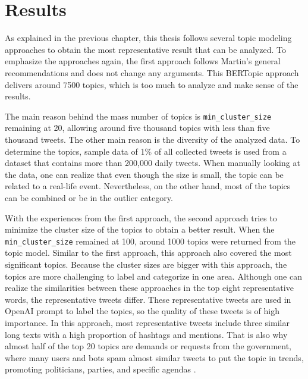 
\chapter{Results}\label{chapter:results}

As explained in the previous chapter, this thesis follows several topic modeling approaches to 
obtain the most representative result that can be analyzed. To emphasize the approaches again, 
the first approach follows Martin's general recommendations and does not change any arguments. 
This BERTopic approach delivers around 7500 topics, which is too much to analyze and make sense 
of the results. 

The main reason behind the mass number of topics is \texttt{min\_cluster\_size} remaining at 20, 
allowing around five thousand topics with less than five thousand tweets. The other main reason 
is the diversity of the analyzed data. To determine the topics, sample data of 1\% of all collected 
tweets is used from a dataset that contains more than 200,000 daily tweets. 
When manually looking at the data, one can realize that even though the size is small, the topic 
can be related to a real-life event. Nevertheless, on the other hand, most of the topics can be 
combined or be in the outlier category.

With the experiences from the first approach, the second approach tries to minimize the 
cluster size of the topics to obtain a better result. When the \texttt{min\_cluster\_size} remained 
at 100, around 1000 topics were returned from the topic model. Similar to the first approach, 
this approach also covered the most significant topics. Because the cluster sizes are bigger 
with this approach, the topics are more challenging to label and categorize in one area. Although 
one can realize the similarities between these approaches in the top eight representative words, 
the representative tweets differ. These representative tweets are used in OpenAI prompt to label 
the topics, so the quality of these tweets is of high importance. In this approach, most 
representative tweets include three similar long texts with a high proportion of hashtags and 
mentions. That is also why almost half of the top 20 topics are demands or requests from the 
government, where many users and bots spam almost similar tweets to put the topic in trends, 
promoting politicians, parties, and specific agendas \parencite{secim2023}.


